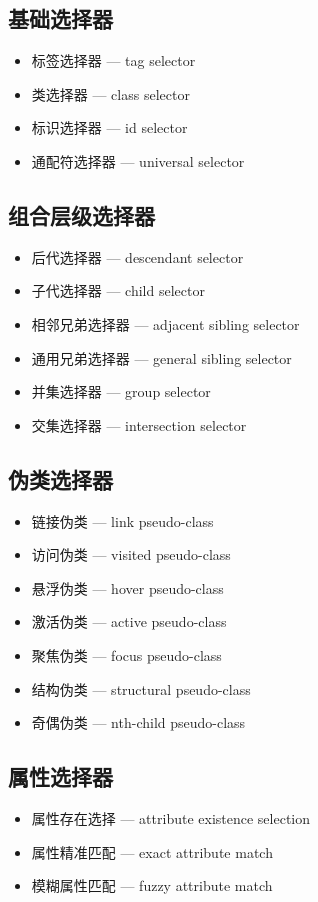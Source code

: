 \subsection{基础选择器}
\begin{itemize}
\item 标签选择器 — tag selector
\item 类选择器 — class selector
\item 标识选择器 — id selector
\item 通配符选择器 — universal selector
\end{itemize}

\subsection{组合层级选择器}
\begin{itemize}
\item 后代选择器 — descendant selector
\item 子代选择器 — child selector
\item 相邻兄弟选择器 — adjacent sibling selector
\item 通用兄弟选择器 — general sibling selector
\item 并集选择器 — group selector
\item 交集选择器 — intersection selector
\end{itemize}

\subsection{伪类选择器}
\begin{itemize}
\item 链接伪类 — link pseudo-class
\item 访问伪类 — visited pseudo-class
\item 悬浮伪类 — hover pseudo-class
\item 激活伪类 — active pseudo-class
\item 聚焦伪类 — focus pseudo-class
\item 结构伪类 — structural pseudo-class
\item 奇偶伪类 — nth-child pseudo-class
\end{itemize}

\subsection{属性选择器}
\begin{itemize}
\item 属性存在选择 — attribute existence selection
\item 属性精准匹配 — exact attribute match
\item 模糊属性匹配 — fuzzy attribute match
\end{itemize}

